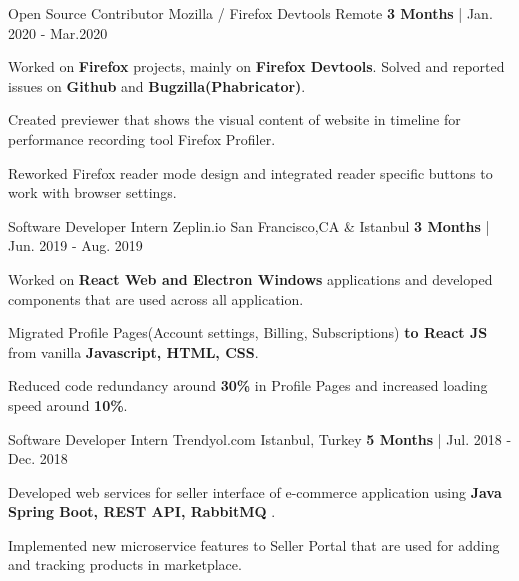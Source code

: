 \begin{cventries}
  \cventry
   {Open Source Contributor} %
    {Mozilla / Firefox Devtools} %
    {Remote} %
    {\textbf{3 Months} | Jan. 2020 - Mar.2020} %
    {
      \begin{cvitems} %
        \item {Worked on \textbf{Firefox} projects, mainly on \textbf{Firefox Devtools}. Solved and reported issues on \textbf{Github} and \textbf{Bugzilla(Phabricator)}.}
        \item {Created previewer that shows the visual content of website in timeline for performance recording tool Firefox Profiler.
        \item {Reworked Firefox reader mode design and integrated reader specific buttons to work with browser settings.}
}
      \end{cvitems}
    }
  \cventry
   {Software Developer Intern} %
    {Zeplin.io} %
    {San Francisco,CA \& Istanbul} %
    {\textbf{3 Months} | Jun. 2019 - Aug. 2019} %
    {
      \begin{cvitems} %
        \item {Worked on \textbf{React Web and Electron Windows} applications and developed components that are used across all application.}
		\item {Migrated Profile Pages(Account settings, Billing, Subscriptions) \textbf{to React JS} from vanilla \textbf{Javascript, HTML, CSS}.}
        \item {Reduced code redundancy around \textbf{30\%} in Profile Pages and increased loading speed around \textbf{10\%}. }
      \end{cvitems}
    }
  \cventry
   {Software Developer Intern} %
    {Trendyol.com} %
    {Istanbul, Turkey} %
    {\textbf{5 Months} | Jul. 2018 - Dec. 2018} %
    {
      \begin{cvitems} %
		 \item {Developed web services for seller interface of e-commerce application using \textbf{Java Spring Boot, REST API, RabbitMQ} .}
        \item {Implemented new microservice features to Seller Portal that are used for adding and tracking products in marketplace.}

\end{cvitems}}
\end{cventries}

